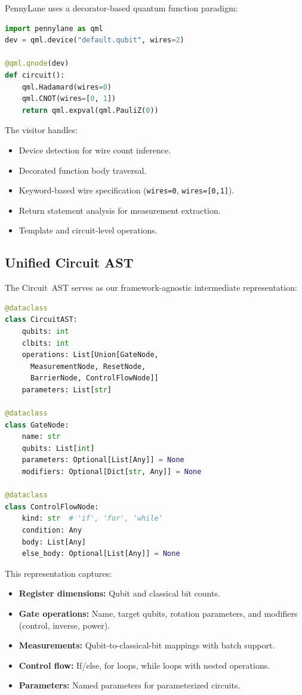 \documentclass[conference]{IEEEtran}
\begin{document}
PennyLane uses a decorator-based quantum function paradigm:
\begin{lstlisting}[language=Python, caption={Typical PennyLane circuit construction pattern}]
import pennylane as qml
dev = qml.device("default.qubit", wires=2)

@qml.qnode(dev)
def circuit():
    qml.Hadamard(wires=0)
    qml.CNOT(wires=[0, 1])
    return qml.expval(qml.PauliZ(0))
\end{lstlisting}

The visitor handles:
\begin{itemize}
    \item Device detection for wire count inference.
    \item Decorated function body traversal.
    \item Keyword-based wire specification (\texttt{wires=0}, \texttt{wires=[0,1]}).
    \item Return statement analysis for measurement extraction.
    \item Template and circuit-level operations.
\end{itemize}

\subsection{Unified Circuit AST}

The Circuit~AST serves as our framework-agnostic intermediate representation:

\begin{lstlisting}[language=Python, caption={Circuit AST data structures}]
@dataclass
class CircuitAST:
    qubits: int
    clbits: int
    operations: List[Union[GateNode,
      MeasurementNode, ResetNode,
      BarrierNode, ControlFlowNode]]
    parameters: List[str]

@dataclass
class GateNode:
    name: str
    qubits: List[int]
    parameters: Optional[List[Any]] = None
    modifiers: Optional[Dict[str, Any]] = None

@dataclass
class ControlFlowNode:
    kind: str  # 'if', 'for', 'while'
    condition: Any
    body: List[Any]
    else_body: Optional[List[Any]] = None
\end{lstlisting}

This representation captures:
\begin{itemize}
    \item \textbf{Register dimensions:} Qubit and classical bit counts.
    \item \textbf{Gate operations:} Name, target qubits, rotation parameters, and modifiers (control, inverse, power).
    \item \textbf{Measurements:} Qubit-to-classical-bit mappings with batch support.
    \item \textbf{Control flow:} If/else, for loops, while loops with nested operations.
    \item \textbf{Parameters:} Named parameters for parameterized circuits.
\end{itemize}
\end{document}
